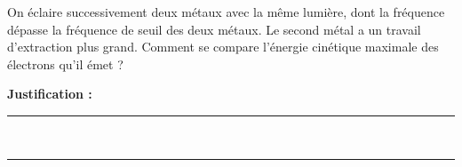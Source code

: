On éclaire successivement deux métaux avec la même lumière, dont la fréquence dépasse la fréquence de seuil des deux métaux. Le second métal a un travail d'extraction plus grand. Comment se compare l'énergie cinétique maximale des électrons qu'il émet ?

\choices

\noindent\textbf{Justification :} \hrulefill \\[2.5ex]
\rule{\linewidth}{0.4pt} \\[2.5ex]
\rule{\linewidth}{0.4pt}
\vfill
